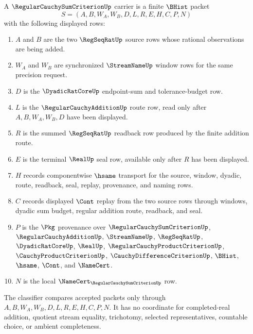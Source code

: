 \begin{definition}
\label{def:regular-cauchy-sum-criterion-carrier}
A $\RegularCauchySumCriterionUp$ carrier is a finite $\BHist$ packet
$$
S=(A,B,W_A,W_B,D,L,R,E,H,C,P,N)
$$
with the following displayed rows:
\begin{enumerate}
\item $A$ and $B$ are the two $\RegSeqRatUp$ source rows whose rational observations are being added.
\item $W_A$ and $W_B$ are synchronized $\StreamNameUp$ window rows for the same precision request.
\item $D$ is the $\DyadicRatCoreUp$ endpoint-sum and tolerance-budget row.
\item $L$ is the $\RegularCauchyAdditionUp$ route row, read only after $A,B,W_A,W_B,D$ have been displayed.
\item $R$ is the summed $\RegSeqRatUp$ readback row produced by the finite addition route.
\item $E$ is the terminal $\RealUp$ seal row, available only after $R$ has been displayed.
\item $H$ records componentwise $\hsame$ transport for the source, window, dyadic, route, readback, seal, replay, provenance, and naming rows.
\item $C$ records displayed $\Cont$ replay from the two source rows through windows, dyadic sum budget, regular addition route, readback, and seal.
\item $P$ is the $\Pkg$ provenance over $\RegularCauchySumCriterionUp$, $\RegularCauchyAdditionUp$, $\StreamNameUp$, $\RegSeqRatUp$, $\DyadicRatCoreUp$, $\RealUp$, $\RegularCauchyProductCriterionUp$, $\CauchyProductCriterionUp$, $\CauchyDifferenceCriterionUp$, $\BHist$, $\hsame$, $\Cont$, and $\NameCert$.
\item $N$ is the local $\NameCert_{\RegularCauchySumCriterionUp}$ row.
\end{enumerate}
The classifier compares accepted packets only through $A,B,W_A,W_B,D,L,R,E,H,C,P,N$. It has no coordinate for completed-real addition, quotient stream equality, trichotomy, selected representatives, countable choice, or ambient completeness.
\end{definition}

